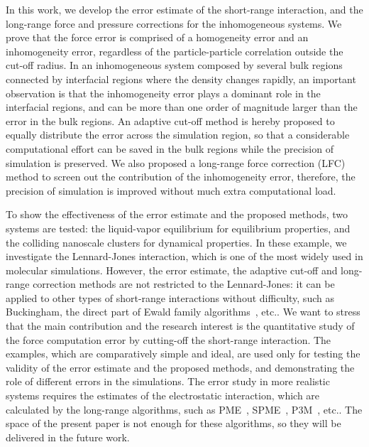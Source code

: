 \documentclass[aps, pre, preprint]{revtex4}
\begin{document}
In this work, we develop the error estimate of the short-range interaction,
and the long-range force and pressure corrections
for the inhomogeneous systems. We prove that the 
force error is comprised of a homogeneity error and an inhomogeneity
error, regardless of the particle-particle correlation outside the
cut-off radius.  In an inhomogeneous system composed by several bulk
regions connected by interfacial regions where the density changes
rapidly, an important observation is that the
inhomogeneity error plays a dominant role in the interfacial regions,
and can be more than one order of magnitude larger than
the error in the bulk regions. An
adaptive cut-off method is hereby proposed to equally distribute the
error across the simulation region, so that a considerable
computational effort can be saved in the bulk regions
while the precision of simulation is
preserved. We also proposed a long-range force correction (LFC) method
to screen out the contribution of the
inhomogeneity error, therefore,  the precision of
simulation is improved without much extra computational load.


To show the
effectiveness of the error estimate and the proposed methods, two
systems are tested: the liquid-vapor equilibrium for equilibrium
properties, and the colliding nanoscale clusters for dynamical
properties.{
  In these example, we investigate the Lennard-Jones interaction, which
  is one of the most widely used in molecular simulations.
  However, the error estimate,
  the adaptive cut-off and long-range correction methods
  are not restricted to the Lennard-Jones: it can
  be applied to other types of short-range interactions without 
  difficulty, such as
  Buckingham, the direct part of Ewald family algorithms~\cite{ewald1921die, darden1993pme, essmann1995spm, deserno1998mue1}, etc..  
  We want to stress that the main contribution and the research interest is the
  quantitative study of the force computation error by cutting-off
  the short-range interaction.
  The examples, which are comparatively simple and ideal,
  are used only for testing the validity of the error
  estimate and the proposed methods,
  and demonstrating the role of different errors in the simulations.
  The error study in more realistic systems requires the
  estimates of the electrostatic interaction,
  which are calculated by the long-range algorithms, such as
  PME~\cite{darden1993pme}, SPME~\cite{essmann1995spm},
  P3M~\cite{deserno1998mue1}, etc..
  The space of the present paper is not enough for
  these algorithms, so they will be delivered in the future work.
}
\end{document}
